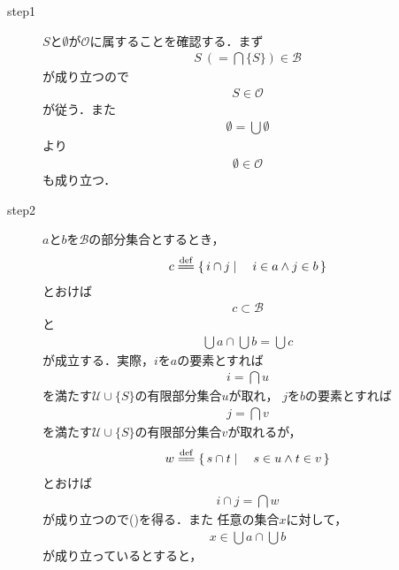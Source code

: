 	\begin{description}
		\item[step1]
			$S$と$\emptyset$が$\mathscr{O}$に属することを確認する．まず
			\begin{align}
				S\ (= \bigcap \{S\}) \in \mathscr{B}
			\end{align}
			が成り立つので
			\begin{align}
				S \in \mathscr{O}
			\end{align}
			が従う．また
			\begin{align}
				\emptyset = \bigcup \emptyset		
			\end{align}
			より
			\begin{align}
				\emptyset \in \mathscr{O}
			\end{align}
			も成り立つ．
		
		\item[step2]
			$a$と$b$を$\mathscr{B}$の部分集合とするとき，
			\begin{align}
				c \defeq \Set{i \cap j}{i \in a \wedge j \in b}
			\end{align}
			とおけば
			\begin{align}
				c \subset \mathscr{B}
				\label{fom:generation_of_topology_2}
			\end{align}
			と
			\begin{align}
				\bigcup a \cap \bigcup b = \bigcup c
				\label{fom:generation_of_topology_3}
			\end{align}
			が成立する．実際，$i$を$a$の要素とすれば
			\begin{align}
				i = \bigcap u
			\end{align}
			を満たす$\mathscr{U} \cup \{S\}$の有限部分集合$u$が取れ，
			$j$を$b$の要素とすれば
			\begin{align}
				j = \bigcap v
			\end{align}
			を満たす$\mathscr{U} \cup \{S\}$の有限部分集合$v$が取れるが，
			\begin{align}
				w \defeq \Set{s \cap t}{s \in u \wedge t \in v}
			\end{align}
			とおけば
			\begin{align}
				i \cap j = \bigcap w
			\end{align}
			が成り立つので()を得る．また
			任意の集合$x$に対して，
			\begin{align}
				x \in \bigcup a \cap \bigcup b
			\end{align}
			が成り立っているとすると，
			\begin{align}

\end{align}
\end{description}
